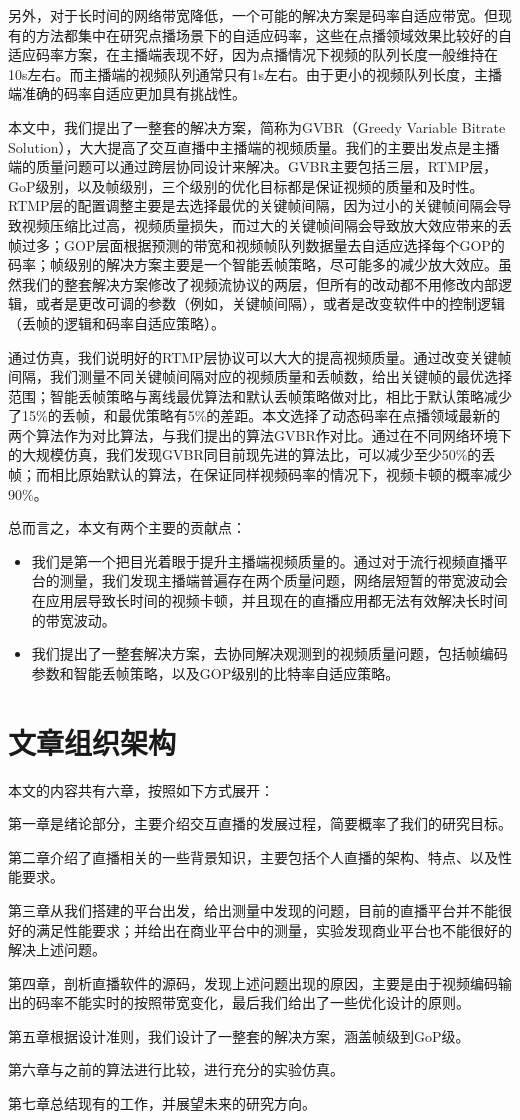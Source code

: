 另外，对于长时间的网络带宽降低，一个可能的解决方案是码率自适应带宽。但现有的方法都集中在研究点播场景下的自适应码率，这些在点播领域效果比较好的自适应码率方案，在主播端表现不好，因为点播情况下视频的队列长度一般维持在10s左右。而主播端的视频队列通常只有1s左右。由于更小的视频队列长度，主播端准确的码率自适应更加具有挑战性。

本文中，我们提出了一整套的解决方案，简称为GVBR（Greedy Variable Bitrate Solution），大大提高了交互直播中主播端的视频质量。我们的主要出发点是主播端的质量问题可以通过跨层协同设计来解决。GVBR主要包括三层，RTMP层，GoP级别，以及帧级别，三个级别的优化目标都是保证视频的质量和及时性。 RTMP层的配置调整主要是去选择最优的关键帧间隔，因为过小的关键帧间隔会导致视频压缩比过高，视频质量损失，而过大的关键帧间隔会导致放大效应带来的丢帧过多；GOP层面根据预测的带宽和视频帧队列数据量去自适应选择每个GOP的码率；帧级别的解决方案主要是一个智能丢帧策略，尽可能多的减少放大效应。虽然我们的整套解决方案修改了视频流协议的两层，但所有的改动都不用修改内部逻辑，或者是更改可调的参数（例如，关键帧间隔），或者是改变软件中的控制逻辑（丢帧的逻辑和码率自适应策略）。

通过仿真，我们说明好的RTMP层协议可以大大的提高视频质量。通过改变关键帧间隔，我们测量不同关键帧间隔对应的视频质量和丢帧数，给出关键帧的最优选择范围；智能丢帧策略与离线最优算法和默认丢帧策略做对比，相比于默认策略减少了15\%的丢帧，和最优策略有5\%的差距。本文选择了动态码率在点播领域最新的两个算法作为对比算法，与我们提出的算法GVBR作对比。通过在不同网络环境下的大规模仿真，我们发现GVBR同目前现先进的算法比，可以减少至少50\%的丢帧；而相比原始默认的算法，在保证同样视频码率的情况下，视频卡顿的概率减少90\%。

总而言之，本文有两个主要的贡献点：
\begin{itemize}
  \item 我们是第一个把目光着眼于提升主播端视频质量的。通过对于流行视频直播平台的测量，我们发现主播端普遍存在两个质量问题，网络层短暂的带宽波动会在应用层导致长时间的视频卡顿，并且现在的直播应用都无法有效解决长时间的带宽波动。
  \item 我们提出了一整套解决方案，去协同解决观测到的视频质量问题，包括帧编码参数和智能丢帧策略，以及GOP级别的比特率自适应策略。
\end{itemize}

\section{文章组织架构}
本文的内容共有六章，按照如下方式展开：

第一章是绪论部分，主要介绍交互直播的发展过程，简要概率了我们的研究目标。

第二章介绍了直播相关的一些背景知识，主要包括个人直播的架构、特点、以及性能要求。

第三章从我们搭建的平台出发，给出测量中发现的问题，目前的直播平台并不能很好的满足性能要求；并给出在商业平台中的测量，实验发现商业平台也不能很好的解决上述问题。

第四章，剖析直播软件的源码，发现上述问题出现的原因，主要是由于视频编码输出的码率不能实时的按照带宽变化，最后我们给出了一些优化设计的原则。

第五章根据设计准则，我们设计了一整套的解决方案，涵盖帧级到GoP级。

第六章与之前的算法进行比较，进行充分的实验仿真。

第七章总结现有的工作，并展望未来的研究方向。

